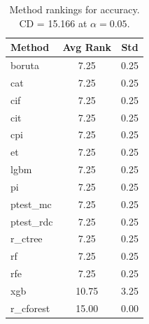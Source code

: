 \begin{table}[h]
\centering
\caption{Method rankings for accuracy. CD = 15.166 at $\alpha=0.05$.}
\label{tab:ranks_accuracy}
\begin{tabular}{lcc}
\toprule
Method & Avg Rank & Std \\
\midrule
boruta & 7.25 & 0.25 \\
cat & 7.25 & 0.25 \\
cif & 7.25 & 0.25 \\
cit & 7.25 & 0.25 \\
cpi & 7.25 & 0.25 \\
et & 7.25 & 0.25 \\
lgbm & 7.25 & 0.25 \\
pi & 7.25 & 0.25 \\
ptest_mc & 7.25 & 0.25 \\
ptest_rdc & 7.25 & 0.25 \\
r_ctree & 7.25 & 0.25 \\
rf & 7.25 & 0.25 \\
rfe & 7.25 & 0.25 \\
xgb & 10.75 & 3.25 \\
r_cforest & 15.00 & 0.00 \\
\bottomrule
\end{tabular}
\end{table}